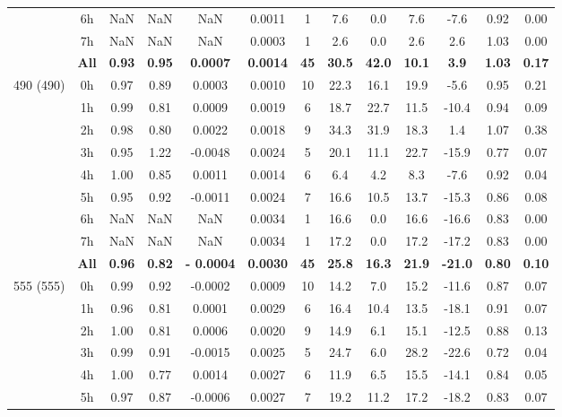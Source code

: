 \documentclass[preview]{standalone}
\begin{document}
\begin{tabular}{ccccccccccccc}
& 6h   & NaN & NaN & NaN & 0.0011 &  1 & 7.6 & 0.0 & 7.6 & -7.6 & 0.92 & 0.00 \\ 
& 7h   & NaN & NaN & NaN & 0.0003 &  1 & 2.6 & 0.0 & 2.6 & 2.6 & 1.03 & 0.00 \\ \cline{2-13}
 & \textbf{All} & \textbf{0.93} & \textbf{0.95} & \textbf{0.0007} & \textbf{0.0014} & \textbf{45} & \textbf{30.5} & \textbf{42.0} & \textbf{10.1} & \textbf{3.9} & \textbf{1.03} & \textbf{0.17} \\ \hline
\multirow{9}{*}{490 (490)} & 0h  & 0.97 & 0.89 & 0.0003 & 0.0010 & 10 & 22.3 & 16.1 & 19.9 & -5.6 & 0.95 & 0.21 \\ 
& 1h   & 0.99 & 0.81 & 0.0009 & 0.0019 &  6 & 18.7 & 22.7 & 11.5 & -10.4 & 0.94 & 0.09 \\ 
& 2h   & 0.98 & 0.80 & 0.0022 & 0.0018 &  9 & 34.3 & 31.9 & 18.3 & 1.4 & 1.07 & 0.38 \\ 
& 3h   & 0.95 & 1.22 & -0.0048 & 0.0024 &  5 & 20.1 & 11.1 & 22.7 & -15.9 & 0.77 & 0.07 \\ 
& 4h   & 1.00 & 0.85 & 0.0011 & 0.0014 &  6 & 6.4 & 4.2 & 8.3 & -7.6 & 0.92 & 0.04 \\ 
& 5h   & 0.95 & 0.92 & -0.0011 & 0.0024 &  7 & 16.6 & 10.5 & 13.7 & -15.3 & 0.86 & 0.08 \\ 
& 6h   & NaN & NaN & NaN & 0.0034 &  1 & 16.6 & 0.0 & 16.6 & -16.6 & 0.83 & 0.00 \\ 
& 7h   & NaN & NaN & NaN & 0.0034 &  1 & 17.2 & 0.0 & 17.2 & -17.2 & 0.83 & 0.00 \\ \cline{2-13}
 & \textbf{All} & \textbf{0.96} & \textbf{0.82} & \textbf{- 0.0004} & \textbf{0.0030} & \textbf{45} & \textbf{25.8} & \textbf{16.3} & \textbf{21.9} & \textbf{-21.0} & \textbf{0.80} & \textbf{0.10} \\ \hline
\multirow{9}{*}{555 (555)} & 0h  & 0.99 & 0.92 & -0.0002 & 0.0009 & 10 & 14.2 & 7.0 & 15.2 & -11.6 & 0.87 & 0.07 \\ 
& 1h   & 0.96 & 0.81 & 0.0001 & 0.0029 &  6 & 16.4 & 10.4 & 13.5 & -18.1 & 0.91 & 0.07 \\ 
& 2h   & 1.00 & 0.81 & 0.0006 & 0.0020 &  9 & 14.9 & 6.1 & 15.1 & -12.5 & 0.88 & 0.13 \\ 
& 3h   & 0.99 & 0.91 & -0.0015 & 0.0025 &  5 & 24.7 & 6.0 & 28.2 & -22.6 & 0.72 & 0.04 \\ 
& 4h   & 1.00 & 0.77 & 0.0014 & 0.0027 &  6 & 11.9 & 6.5 & 15.5 & -14.1 & 0.84 & 0.05 \\ 
& 5h   & 0.97 & 0.87 & -0.0006 & 0.0027 &  7 & 19.2 & 11.2 & 17.2 & -18.2 & 0.83 & 0.07 \\ 

\end{tabular}
\end{document}
